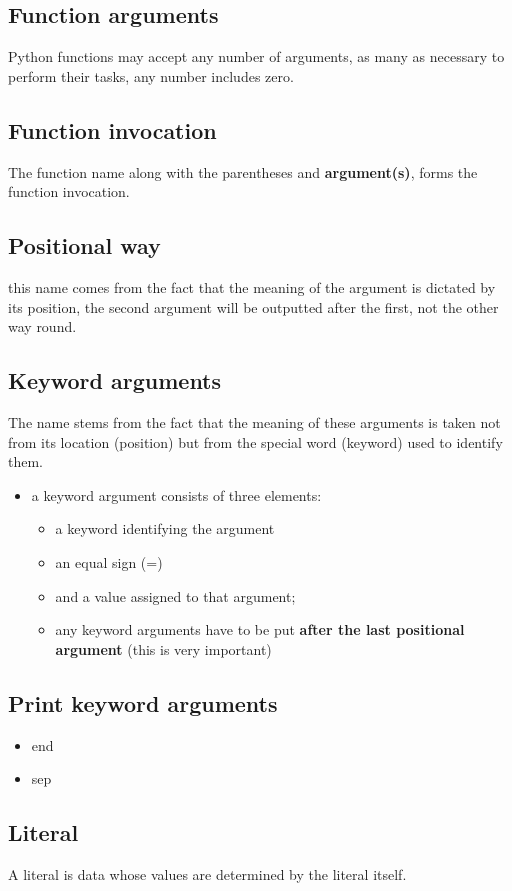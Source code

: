 \documentclass[11pt]{article}
\begin{document}
\subsection{Function arguments}
\label{sec:org32e0bc1}
Python functions may accept any number of arguments, as many as
necessary to perform their tasks, any number includes zero.
\subsection{Function invocation}
\label{sec:org1545d6a}
The function name along with the parentheses and \textbf{argument(s)}, forms
the function invocation.
\subsection{Positional way}
\label{sec:org18d529a}
this name comes from the fact that the meaning of the argument is
dictated by its position, the second argument will be outputted after
the first, not the other way round.
\subsection{Keyword arguments}
\label{sec:org4bfd447}
The name stems from the fact that the meaning of these arguments is
taken not from its location (position) but from the special word
(keyword) used to identify them.
\begin{itemize}
\item a keyword argument consists of three elements: 
\begin{itemize}
\item a keyword identifying the argument
\item an equal sign (=)
\item and a value assigned to that argument;
\item any keyword arguments have to be put \textbf{after the last positional
argument} (this is very important)
\end{itemize}
\end{itemize}
\subsection{Print keyword arguments}
\label{sec:org6161b7e}
\begin{itemize}
\item end
\item sep
\end{itemize}
\subsection{Literal}
\label{sec:orgf21ee00}
A literal is data whose values are determined by the literal itself.
\end{document}
